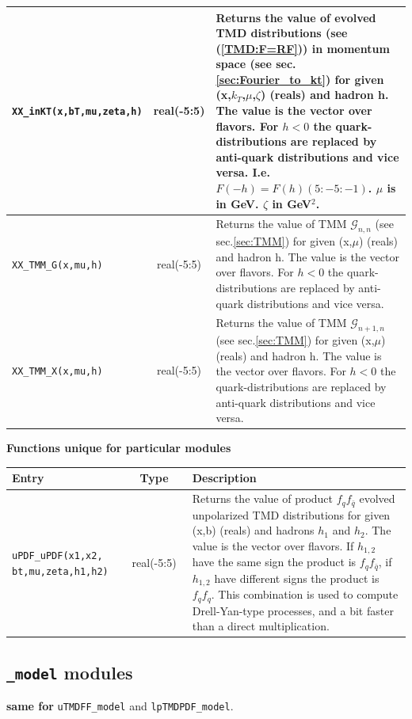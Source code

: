 \documentclass[prd,nofootinbib,eqsecnum,final]{revtex4}
\renewcommand{\(}{\left(}
\renewcommand{\)}{\right)}
\renewcommand{\[}{\left[}
\renewcommand{\]}{\right]}
\newcommand{\blue}[1]{{\color{blue} #1}}
\begin{document}
\begin{center}
\begin{tabular}{||p{5.5cm}||c||p{8.5cm}||}
\texttt{XX\_inKT(x,bT,mu,zeta,h)} & real(-5:5) & Returns the value of \blue{evolved} TMD distributions (see (\ref{TMD:F=RF})) \blue{in momentum space} (see sec.\ref{sec:Fourier_to_kt}) for given (x,$k_T$,$\mu$,$\zeta$) (reals) and hadron h. The value is the vector over flavors. For $h<0$ the quark-distributions are replaced by anti-quark distributions and vice versa. I.e. $F(-h)=F(h)(5:-5:-1)$. $\mu$ is in GeV. $\zeta$ in GeV$^2$.
\\\hline
\texttt{XX\_TMM\_G(x,mu,h)} & real(-5:5) & Returns the value of TMM $\mathcal{G}_{n,n}$ (see sec.\ref{sec:TMM}) for given (x,$\mu$) (reals) and hadron h. The value is the vector over flavors. For $h<0$ the quark-distributions are replaced by anti-quark distributions and vice versa.
\\\hline
\texttt{XX\_TMM\_X(x,mu,h)} & real(-5:5) & Returns the value of TMM $\mathcal{G}_{n+1,n}$ (see sec.\ref{sec:TMM}) for given (x,$\mu$) (reals) and hadron h. The value is the vector over flavors. For $h<0$ the quark-distributions are replaced by anti-quark distributions and vice versa.
\\\hline\hline
\end{tabular}
\end{center}

\begin{center}
\textbf{Functions unique for particular modules}
\\
\begin{tabular}{||p{5.5cm}||c||p{8.5cm}||}
\hline\hline
Entry &~~Type~~& Description
\\\hline
\texttt{uPDF\_uPDF(x1,x2,} \texttt{bt,mu,zeta,h1,h2)} & real(-5:5) & Returns the value of product $f_q f_{\bar q}$ evolved unpolarized TMD distributions for given (x,b) (reals) and hadrons $h_1$ and $h_2$. The value is the vector over flavors. If $h_{1,2}$ have the same sign the product is $f_q f_{\bar q}$, if $h_{1,2}$ have different signs the product is $f_q f_{q}$. This combination is used to compute Drell-Yan-type processes, and a bit faster than a direct multiplication.
\\\hline\hline
\end{tabular}
\end{center}

\newpage
\subsection{\texttt{\_model} modules}
\begin{center}
\blue{\textbf{same for}} \texttt{uTMDFF\_model} and \texttt{lpTMDPDF\_model}.
\end{center}
\end{document}
